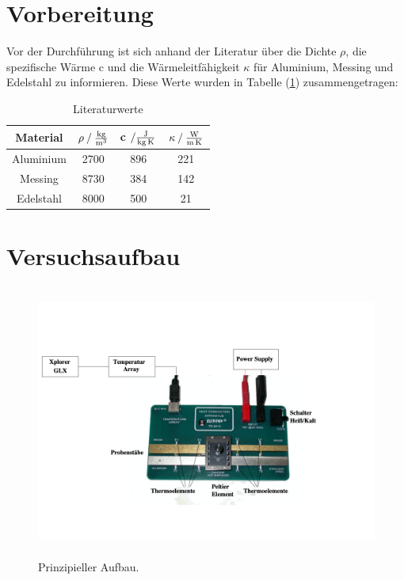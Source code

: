 \section{Vorbereitung}
Vor der Durchführung ist sich anhand der Literatur über die Dichte $\rho$, die spezifische Wärme c und die Wärmeleitfähigkeit $\kappa$ für Aluminium, Messing und Edelstahl zu informieren.
Diese Werte wurden  in Tabelle (\ref{tab:literaturwerte}) zusammengetragen:

\begin{table}
\centering
\begin{tabular}{c c c c }
\toprule
{Material} &{$ \rho \mathbin{/} \si[per-mode=fraction]{\kilo\gram\per\cubic\meter} $} & {c $ \mathbin{/} \si[per-mode=fraction]{\joule\per\kilo\gram\per\kelvin} $} & {$ \kappa \mathbin{/} \si[per-mode=fraction]{\watt\per\meter\per\kelvin} $} \\
\midrule
Aluminium & 2700 & 896 & 221 \\
Messing   & 8730 & 384 & 142 \\
Edelstahl & 8000 & 500 & 21  \\
\bottomrule
\end{tabular}
\caption{Literaturwerte}
\label{tab:literaturwerte}
\end{table}

\newpage
\section{Versuchsaufbau}

\begin{figure}
            \centering
               \includegraphics[height=9cm]{V204_aufbau.pdf}
               \caption{Prinzipieller Aufbau.}
               \label{fig:aufbauwaermeleitung}
        \end{figure}

